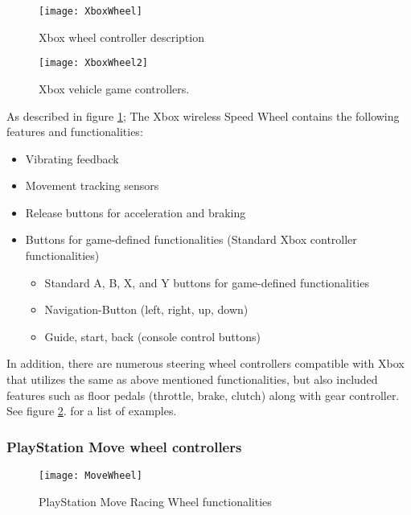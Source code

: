 \begin{figure}[p]
\centering
\caption{Xbox wheel controller description \parencite{Xbox2013}}
\label{fig:XboxWheel}
\texttt{[image: XboxWheel]} 
\end{figure}
\begin{figure}[p]
\centering
\texttt{[image: XboxWheel2]}
\caption{Xbox vehicle game controllers. \parencite{Xbox2013}}
\label{fig:XboxWheel2}
\end{figure}

As described in figure \ref{fig:XboxWheel}; The Xbox wireless Speed Wheel contains the following features and functionalities:

\begin{itemize}
\item Vibrating feedback
\item Movement tracking sensors
\item Release buttons for acceleration and braking
\item Buttons for game-defined functionalities (Standard Xbox controller functionalities)
	\begin{itemize}
		\item Standard A, B, X, and Y buttons for game-defined functionalities
		\item Navigation-Button (left, right, up, down)
		\item Guide, start, back (console control buttons)
	\end{itemize}
\end{itemize}

In addition, there are numerous steering wheel controllers compatible with Xbox that utilizes the same as above mentioned functionalities, but also included features such as floor pedals (throttle, brake, clutch) along with gear controller. See figure \ref{fig:XboxWheel2}. for a list of examples.
\bigskip

\pagebreak[4]

\subsubsection*{PlayStation Move wheel controllers}
\parencite{Move2013}

\begin{figure}[!htbp]
\centering
\texttt{[image: MoveWheel]}
\caption{PlayStation Move Racing Wheel functionalities \parencite{Move2013}}
\label{fig:MoveWheel}
\end{figure}

